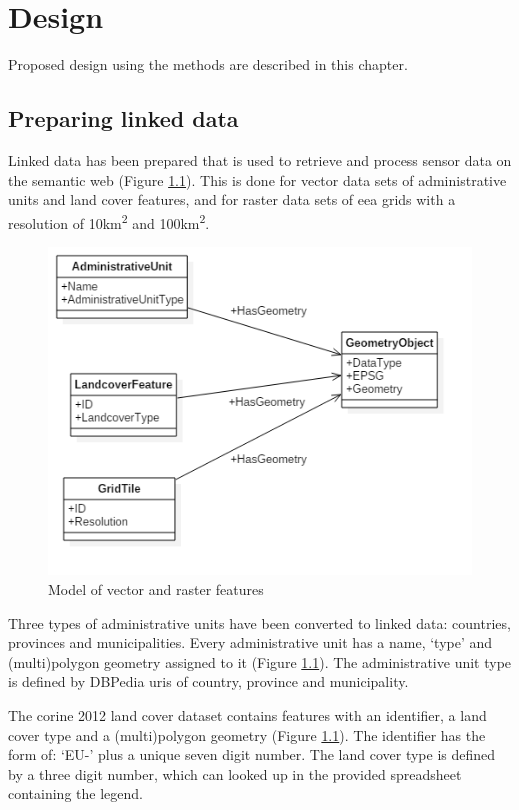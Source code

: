 

\chapter{Design}
\label{chap:impl}

Proposed design using the methods are described in this chapter.

\section{Preparing linked data}
Linked data has been prepared that is used to retrieve and process sensor data on the semantic web (Figure \ref*{fig:Static}). This is done for vector data sets of administrative units and land cover features, and for raster data sets of \ac{eea} grids with a resolution of 10km\textsuperscript{2} and 100km\textsuperscript{2}. 

\begin{figure}
	\includegraphics[width=0.7\linewidth]{UML/staticdata2.PNG}
	\caption{Model of vector and raster features}
	\label{fig:Static}
\end{figure}

Three types of administrative units have been converted to linked data: countries, provinces and municipalities. Every administrative unit has a name, `type' and (multi)polygon geometry assigned to it (Figure \ref{fig:Static}). The administrative unit type is defined by DBPedia \ac{uri}s of country, province and municipality. 

The \ac{corine} 2012 land cover dataset contains features with an identifier, a land cover type and a (multi)polygon geometry (Figure \ref{fig:Static}). The identifier has the form of: `EU-' plus a unique seven digit number. The land cover type is defined by a three digit number, which can looked up in the provided spreadsheet containing the legend.    

